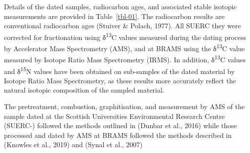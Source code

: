\documentclass[
]{agujournal2019}
\begin{document}
Details of the dated samples, radiocarbon ages, and associated stable
isotopic measurements are provided in Table~\ref{tbl-01}. The
radiocarbon results are conventional radiocarbon ages (Stuiver \&
Polach, 1977). All SUERC they were corrected for fractionation using
δ\textsuperscript{13}C values measured during the dating process by
Accelerator Mass Spectrometry (AMS), and at BRAMS using the
δ\textsuperscript{13}C value measured by Isotope Ratio Mass Spectrometry
(IRMS). In addition, δ\textsuperscript{13}C values and
δ\textsuperscript{15}N values have been obtained on sub-samples of the
dated material by Isotope Ratio Mass Spectrometry, as these results more
accurately reflect the natural isotopic composition of the sampled
material.

The pretreatment, combustion, graphitisation, and measurement by AMS of
the sample dated at the Scottish Universities Environmental Research
Centre (SUERC-) followed the methods outlined in (Dunbar et al., 2016)
while those processed and dated by AMS at BRAMS followed the methods
described in (Knowles et al., 2019) and (Synal et al., 2007)
\end{document}
